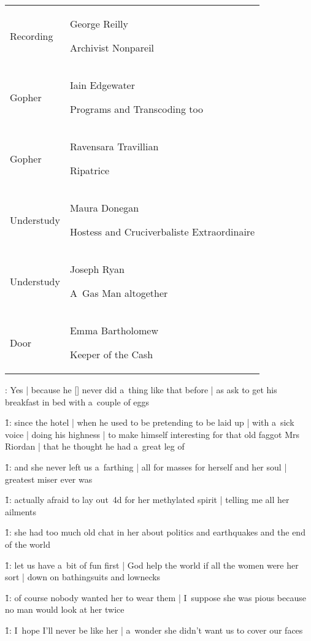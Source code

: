 \begin{tabular}{lp{10cm}}
Recording & George Reilly \par
     \footnotesize Archivist Nonpareil \\
Gopher & Iain Edgewater \par
     \footnotesize Programs and Transcoding too \\
Gopher & Ravensara Travillian \par
     \footnotesize Ripatrice \\
Understudy & Maura Donegan \par
     \footnotesize Hostess and Cruciverbaliste Extraordinaire \\
Understudy & Joseph Ryan \par
     \footnotesize A~Gas Man altogether \\
Door & Emma Bartholomew \par
     \footnotesize Keeper of the Cash \\
\end{tabular}

\thispagestyle{empty}
\newpage


\setcounter{page}{1}




:
Yes |
because he [\bloom] never did a~thing like that before |
as ask to get his breakfast in bed with a~couple of eggs

\f1:
since the  hotel |
when he used to be pretending to be laid up |
with a~sick voice |
doing his highness |
to make himself interesting for that old faggot Mrs Riordan |
that he thought he had a~great leg of

\f1:
and she never left us a~farthing |
all for masses for herself and her soul |
greatest miser ever was

\f1:
actually afraid to lay out~4d for her methylated spirit |
telling me all her ailments

\f1:
she had too much old chat in her about politics and earthquakes
and the end of the world

\f1:
let us have a~bit of fun first |
God help the world if all the women were her sort |
down on bathingsuits and lownecks

\f1:
of course nobody wanted her to wear them |
I~suppose she was pious because no man would look at her twice

\f1:
I~hope I'll never be like her |
a~wonder she didn't want us to cover our faces

